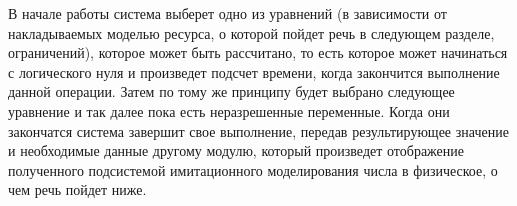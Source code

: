 \indent В начале работы система выберет одно из уравнений (в зависимости от накладываемых моделью ресурса, о которой пойдет речь в следующем разделе, ограничений), которое может быть рассчитано, то есть которое может начинаться с логического нуля и произведет подсчет времени, когда закончится выполнение данной операции.
Затем по тому же принципу будет выбрано следующее уравнение и так далее пока есть неразрешенные переменные.
Когда они закончатся система завершит свое выполнение, передав результирующее значение и необходимые данные другому модулю, который произведет отображение полученного подсистемой имитационного моделирования числа в физическое, о чем речь пойдет ниже.


